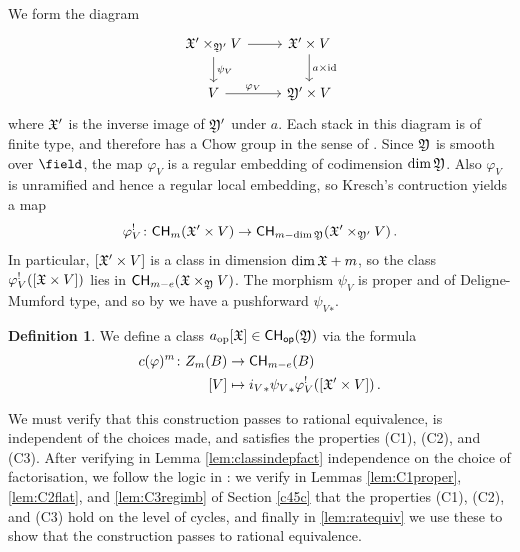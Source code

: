 \documentclass[a4paper,12pt]{article} %
\newcommand{\on}[1]{\operatorname{#1}}
\theoremstyle{definition}
\newtheorem{definition}{Definition} %
\theoremstyle{plain}%
\renewcommand{\phi}{\varphi}
\newcommand{\Chow}{\mathsf{CH}}
\newcommand{\CHop}{\Chow_{\mathsf{op}}}
\begin{document}
We form the diagram
\begin{equation} \label{eq:definingdiagram}
 \begin{tikzcd}
  \frak X' \times_{\frak Y'} V \arrow[r] \arrow[d, "\psi_V"] & \frak X' \times V \arrow[d, "a \times \on{id}"]  \\
  V \arrow[r, "\phi_V"] & \frak Y' \times V 
\end{tikzcd}
\end{equation}
where $\frak X'$ is the inverse image of $\frak Y'$ under $a$. Each stack in this diagram is of finite type, and therefore has a Chow group in the sense of \cite{Kresch1999Cycle-groups-fo}. Since $\frak Y$ is  smooth over ${\field}$, the map $\phi_V$ is a regular embedding of codimension $\dim \frak Y$. Also $\phi_V$ is unramified and hence a regular local embedding, so Kresch's contruction yields a map $$\phi_V^!\colon \Chow_m(\frak X' \times V) \to \Chow_{m-\dim \frak Y}(\frak X' \times_{\frak Y'} V)\, .$$ 
In particular, $[\frak X' \times V]$ is a class in dimension $\dim \frak X + m$, so the class $\phi_V^! ([\frak X \times V])$ lies in $\Chow_{m-e} (\frak X \times_{\frak Y} V)$. 
The morphism $\psi_V$ is proper and of Deligne-Mumford type, and so by \cite[Appendix B]{BaeSchmitt1} we have a pushforward ${\psi_V}_*$. \begin{definition}\label{defbivariantclass}
We define a class $a_{\on{op}}[\frak X] \in \CHop(\frak Y)$ 
via the formula
\begin{align}
    c(\phi)^{m}\colon Z_m(B) &\to \Chow_{m-e}(B) \\
    [V] &\mapsto {i_V}_* {\psi_V}_* \phi_V^! ([\frak X' \times V])\, . \nonumber
\end{align}
\end{definition}
We must verify that this construction passes to rational equivalence, is independent of the choices made, and satisfies the properties (C1), (C2), and (C3). 
After verifying in Lemma \ref{lem:classindepfact} independence on the choice of factorisation, we follow the logic in \cite{Fulton1984Intersection-th}: we verify in Lemmas \ref{lem:C1proper}, \ref{lem:C2flat}, and \ref{lem:C3regimb} of Section \ref{c45c} that the properties (C1), (C2), and (C3) hold on the level of cycles, and finally in \cref{lem:ratequiv} we use these to show that the construction passes to rational equivalence. 

\end{document}
